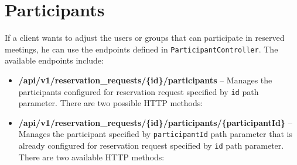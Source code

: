 \section{Participants}
If a client wants to adjust the users or groups that can participate in reserved meetings, he can use the endpoints defined in  \texttt{Participant\-Controller}.
The available endpoints include:
\begin{itemize}
    \item \textbf{/api/v1/reservation\_requests/\{id\}/participants} -- Manages the participants configured for reservation request specified by \texttt{id} path parameter. There are two possible HTTP methods:
    \item \textbf{/api/v1/reservation\_requests/\{id\}/participants/\{participantId\}} -- Manages the participant specified by \texttt{participantId} path parameter that is already configured for reservation request specified by \texttt{id} path parameter. There are two available HTTP methods:
\end{itemize}
